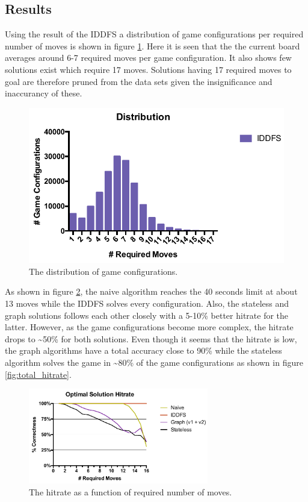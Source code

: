 \documentclass[]{article}
\begin{document}
\subsection{Results}\label{results}

Using the result of the IDDFS a distribution of game configurations per
required number of moves is shown in figure \ref{fig:dist}. Here it is
seen that the the current board averages around 6-7 required moves per
game configuration. It also shows few solutions exist which require 17
moves. Solutions having 17 required moves to goal are therefore pruned
from the data sets given the insignificance and inaccurancy of these.

\begin{figure}[ht]
\centering
\includegraphics[width=0.7\linewidth]{img/dist.pdf}
\caption{The distribution of game configurations. }
\label{fig:dist}
\end{figure}

As shown in figure \ref{fig:hitrate}, the naive algorithm reaches the 40
seconds limit at about 13 moves while the IDDFS solves every
configuration. Also, the stateless and graph solutions follows each
other closely with a 5-10\% better hitrate for the latter. However, as
the game configurations become more complex, the hitrate drops to
\textasciitilde{}50\% for both solutions. Even though it seems that the
hitrate is low, the graph algorithms have a total accuracy close to 90\%
while the stateless algorithm solves the game in \textasciitilde{}80\%
of the game configurations as shown in figure \ref{fig:total_hitrate}.

\begin{figure}[htb]
\centering
\includegraphics[height=0.25\textheight,width=0.7\textwidth,keepaspectratio]{img/hitrate.pdf}
\caption{The hitrate as a function of required number of moves.}
\label{fig:hitrate}
\end{figure}
\end{document}
